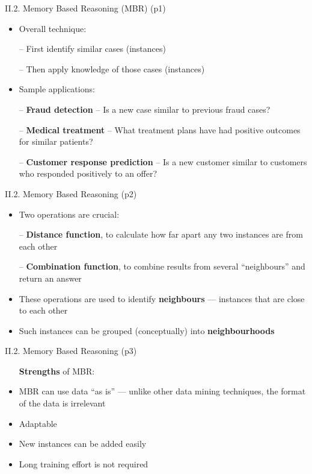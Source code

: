 \documentclass[handout]{beamer}
\newcommand{\strong}[1]{\textbf{\color{teal} #1}}
\newcommand{\stronger}[1]{\textbf{\color{purple} #1}}
\begin{document}
\begin{frame}{II.2. Memory Based Reasoning (MBR) (p1)} %
\begin{itemize}
\item Overall technique:
\item[--] First identify similar cases (instances)
\item[--] Then apply knowledge of those cases (instances)
\item[]
\item Sample applications:
\item[--] \strong{Fraud detection} -- Is a new case similar to previous fraud cases?
\item[--] \strong{Medical treatment} -- What treatment plans have had positive outcomes for similar patients?
\item[--] \strong{Customer response prediction} -- Is a new customer similar to customers who responded positively to an offer?
\end{itemize}
\end{frame}
\begin{frame}{II.2. Memory Based Reasoning (p2)}
\begin{itemize}
\item Two operations are crucial:
\item[--] \stronger{Distance function}, to calculate how far apart any two instances are from each other
\item[--] \stronger{Combination function}, to combine results from several ``neighbours'' and return an answer
\item[]
\item These operations are used to identify \stronger{neighbours} --- instances that are close to each other
\item Such instances can be grouped (conceptually) into \stronger{neighbourhoods}
\end{itemize}
\end{frame}
\begin{frame}{II.2. Memory Based Reasoning (p3)}
\begin{itemize}
\item[] \strong{Strengths} of MBR:
\item[]
\item MBR can use data ``as is'' --- unlike other data mining techniques, the format of the data is irrelevant
\item[]
\item Adaptable
\item[]
\item New instances can be added easily
\item[]
\item Long training effort is not required
\end{itemize}
\end{frame}
\end{document}
